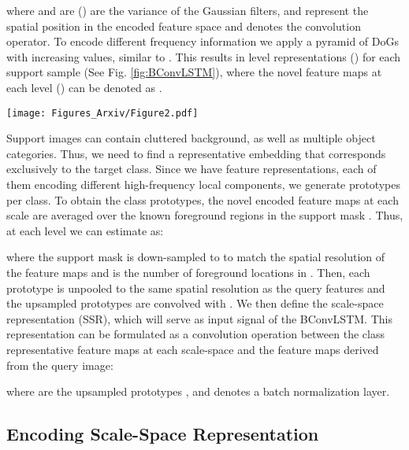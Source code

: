\documentclass[runningheads]{llncs}
\begin{document}
where  and  are () are the variance of the Gaussian filters,  and  represent the spatial position in the encoded feature space and  denotes the convolution operator. To encode different frequency information we apply a pyramid of DoGs with increasing  values, similar to \cite{lowe2004distinctive}. This results in  level representations () for each support sample (See Fig. \ref{fig:BConvLSTM}), where the novel feature maps at each level () can be denoted as .

\begin{figure*}[]
\centering
\texttt{[image: Figures\_Arxiv/Figure2.pdf]}
\caption{The scale-space encoding block in the proposed method. } \label{fig:BConvLSTM}
\end{figure*}

Support images can contain cluttered background, as well as multiple object categories. Thus, we need to find a representative embedding  that corresponds exclusively to the target class. Since we have  feature representations, each of them encoding different high-frequency local components, we generate  prototypes per class. To obtain the class prototypes, the novel encoded feature maps at each scale  are averaged over the known foreground regions in the support mask . Thus, at each level we can estimate  as:

where the support mask  is down-sampled to  to match the spatial resolution of the feature maps  and  is the number of foreground locations in . Then, each prototype is unpooled to the same spatial resolution as the query features  and the upsampled prototypes are convolved with . We then define the scale-space representation (SSR), which will serve as input signal of the BConvLSTM. This representation can be formulated as a convolution operation between the class representative feature maps at each scale-space and the feature maps derived from the query image: 

where  are the upsampled prototypes , and  denotes a batch normalization layer.













\subsection{Encoding Scale-Space Representation}
\end{document}
